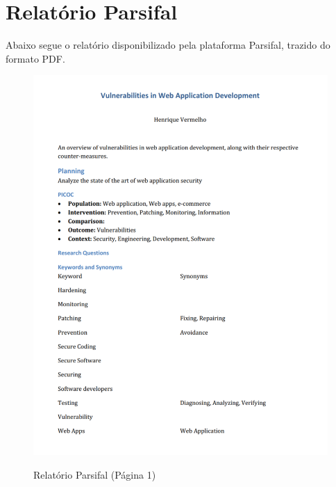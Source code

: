 {\let\clearpage\relax \chapter{\textnormal{Relatório Parsifal}}}

Abaixo segue o relatório disponibilizado pela plataforma Parsifal, trazido do formato PDF.

\begin{figure}[H]
    \centering
    \caption{Relatório Parsifal (Página 1)}
    \includegraphics[width=13cm]{figuras/parsifal_report_1.png} 
    \label{fig:internet} 
\end{figure}
